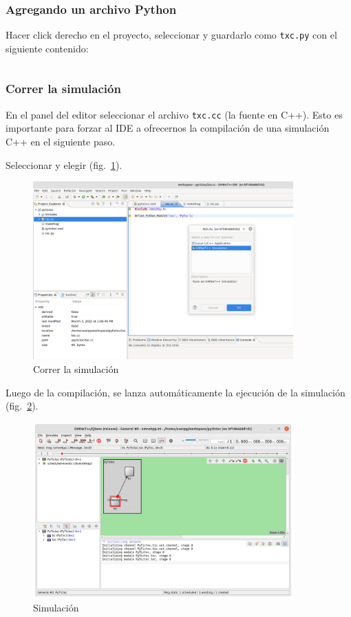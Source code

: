 \documentclass[]{article}
\begin{document}
\subsubsection{Agregando un archivo Python}

Hacer click derecho en el proyecto, seleccionar  y
guardarlo como \verb!txc.py! con el siguiente contenido:

\inputminted{Python}{codelistings/tictoc.py}

\subsubsection{Correr la simulación}

En el panel del editor seleccionar el archivo \verb!txc.cc! (la fuente en C++).
Esto es importante para forzar al IDE a ofrecernos la compilación de una
simulación C++ en el siguiente paso.

Seleccionar  y elegir  (fig.~\ref{fig:run}).

\begin{figure}[h]
\caption{Correr la simulación}
\label{fig:run}
\centering
\includegraphics[width=10cm]{run_simulation}
\end{figure}

Luego de la compilación, se lanza automáticamente la ejecución de la
simulación (fig.~\ref{fig:first_run}).


\begin{figure}[h]
\caption{Simulación}
\label{fig:first_run}
\centering
\includegraphics[width=10cm]{first_run}
\end{figure}
\end{document}
